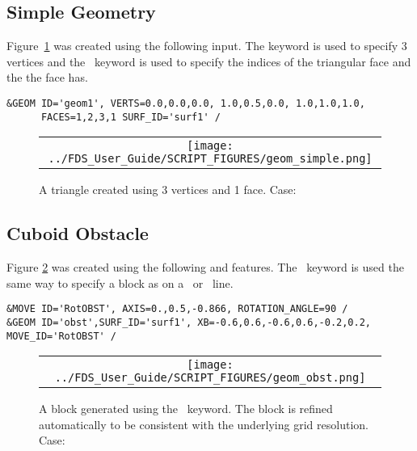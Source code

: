 \documentclass[11pt]{book}
\begin{document}
\subsection{Simple Geometry}

Figure~\ref{fig:geom_simple} was created using the following input. The  keyword is used to specify 3 vertices and the \ keyword is used to specify the indices of the triangular face and the  the face has.
\begin{lstlisting}
&GEOM ID='geom1', VERTS=0.0,0.0,0.0, 1.0,0.5,0.0, 1.0,1.0,1.0,
      FACES=1,2,3,1 SURF_ID='surf1' /
\end{lstlisting}

\begin{figure}[!ht]
\begin{center}
\begin{tabular}{c}
 \texttt{[image: ../FDS\_User\_Guide/SCRIPT\_FIGURES/geom\_simple.png]}
  \end{tabular}
\end{center}
 \caption[Simple triangulated geometry]{A triangle created using 3 vertices and 1 face. Case: }
\label{fig:geom_simple}
\end{figure}


\subsection{Cuboid Obstacle}

Figure \ref{fig:geom_obst} was created using the following  and  features. The \ keyword is used the same way to specify a block as on a \ or \ line.
\begin{lstlisting}
&MOVE ID='RotOBST', AXIS=0.,0.5,-0.866, ROTATION_ANGLE=90 /
&GEOM ID='obst',SURF_ID='surf1', XB=-0.6,0.6,-0.6,0.6,-0.2,0.2, MOVE_ID='RotOBST' /
\end{lstlisting}

\begin{figure}
\begin{center}
\begin{tabular}{c}
 \texttt{[image: ../FDS\_User\_Guide/SCRIPT\_FIGURES/geom\_obst.png]}
  \end{tabular}
\end{center}
 \caption[Block geometry using ]{A block generated using the \ keyword.  The block is refined automatically to be consistent with the underlying grid resolution. Case: }
\label{fig:geom_obst}
\end{figure}
\end{document}
